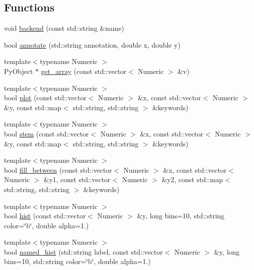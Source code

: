 \subsection*{Functions}
\begin{DoxyCompactItemize}
\item 
void \hyperlink{namespacematplotlibcpp_a7c176020a3312c69b4af6fa80113e53b}{backend} (const std\+::string \&name)
\item 
bool \hyperlink{namespacematplotlibcpp_a4854fc237468144bd46809ea7ce8f2a0}{annotate} (std\+::string annotation, double x, double y)
\item 
{\footnotesize template$<$typename Numeric $>$ }\\Py\+Object $\ast$ \hyperlink{namespacematplotlibcpp_a62d86e190f22181acf7ead76bd57497f}{get\+\_\+array} (const std\+::vector$<$ Numeric $>$ \&v)
\item 
{\footnotesize template$<$typename Numeric $>$ }\\bool \hyperlink{namespacematplotlibcpp_a06ac86c6fecaa5a9b3fb566bc31d6a3b}{plot} (const std\+::vector$<$ Numeric $>$ \&x, const std\+::vector$<$ Numeric $>$ \&y, const std\+::map$<$ std\+::string, std\+::string $>$ \&keywords)
\item 
{\footnotesize template$<$typename Numeric $>$ }\\bool \hyperlink{namespacematplotlibcpp_ae3c91bdfbe011133346dcc4f31ec5932}{stem} (const std\+::vector$<$ Numeric $>$ \&x, const std\+::vector$<$ Numeric $>$ \&y, const std\+::map$<$ std\+::string, std\+::string $>$ \&keywords)
\item 
{\footnotesize template$<$typename Numeric $>$ }\\bool \hyperlink{namespacematplotlibcpp_a928fb4c83f29554b1b37aeea7af9bb73}{fill\+\_\+between} (const std\+::vector$<$ Numeric $>$ \&x, const std\+::vector$<$ Numeric $>$ \&y1, const std\+::vector$<$ Numeric $>$ \&y2, const std\+::map$<$ std\+::string, std\+::string $>$ \&keywords)
\item 
{\footnotesize template$<$typename Numeric $>$ }\\bool \hyperlink{namespacematplotlibcpp_ac0295119bc4ecb6cedd18509409eefd3}{hist} (const std\+::vector$<$ Numeric $>$ \&y, long bins=10, std\+::string color=\char`\"{}b\char`\"{}, double alpha=1.)
\item 
{\footnotesize template$<$typename Numeric $>$ }\\bool \hyperlink{namespacematplotlibcpp_a2851ef02b92b32ee7d3dd8f8fd065ae3}{named\+\_\+hist} (std\+::string label, const std\+::vector$<$ Numeric $>$ \&y, long bins=10, std\+::string color=\char`\"{}b\char`\"{}, double alpha=1.)

\end{DoxyCompactItemize}
